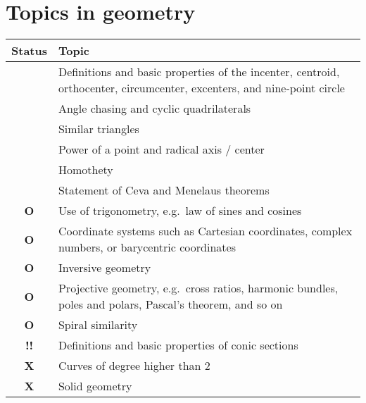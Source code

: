 \documentclass[11pt]{scrartcl}
\providecommand{\isRq}{{\color{green!60!black}\CheckmarkBold}}
\providecommand{\isUs}{{\color{cyan}\sffamily\bfseries O}}
\providecommand{\isAv}{{\color{gray}\sffamily\bfseries !!}}
\providecommand{\isEx}{{\color{red}\sffamily\bfseries X}}
\begin{document}
\section{Topics in geometry}
\begin{center}
  \begin{tabular}{cp{12cm}}
  \toprule Status & Topic \\ \midrule
  \isRq & Definitions and basic properties
    of the incenter, centroid, orthocenter, circumcenter,
    excenters, and nine-point circle \\
  \isRq & Angle chasing and cyclic quadrilaterals \\
  \isRq & Similar triangles \\
  \isRq & Power of a point and radical axis / center \\
  \isRq & Homothety \\
  \isRq & Statement of Ceva and Menelaus theorems \\
  \isUs & Use of trigonometry, e.g.\ law of sines and cosines \\
  \isUs & Coordinate systems such as Cartesian coordinates,
    complex numbers, or barycentric coordinates \\
  \isUs & Inversive geometry \\
  \isUs & Projective geometry, e.g.\ cross ratios, harmonic bundles, poles and polars,
    Pascal's theorem, and so on \\
  \isUs & Spiral similarity \\
  \isAv & Definitions and basic properties of conic sections \\
  \isEx & Curves of degree higher than $2$ \\
  \isEx & Solid geometry \\
  \bottomrule
  \end{tabular}
\end{center}
\end{document}
